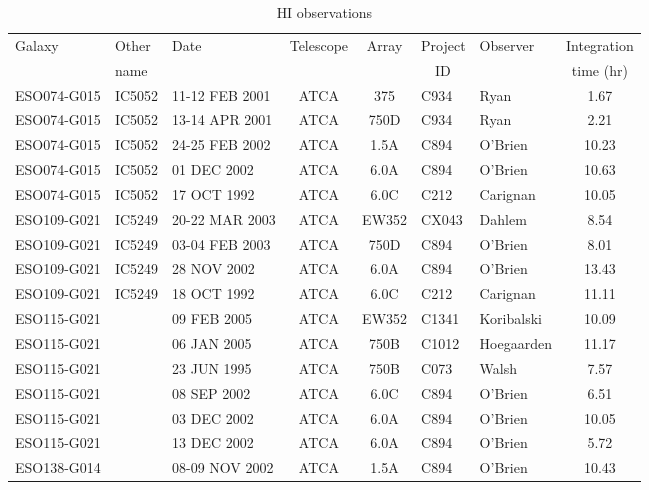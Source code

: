 \documentclass[traditabstract]{aa} %
\begin{document}
\begin{table}[t] %
\centering
\caption[HI observations]{HI observations}
\label{tab:obs-HI}
\begin{small}
\begin{tabular}{lllccllc}
\hline
Galaxy & Other & Date & Telescope & Array & Project & Observer
& Integration \\
& name &&&& \ \ ID && time (hr) \\
\hline\hline
ESO074-G015 & IC5052  & 11-12 FEB 2001 & ATCA & 375   & C934    & Ryan       &     1.67 \\
ESO074-G015 & IC5052  & 13-14 APR 2001 & ATCA & 750D  & C934    & Ryan       &     2.21  \\
ESO074-G015 & IC5052  & 24-25 FEB 2002 & ATCA & 1.5A  & C894    & O'Brien    &    10.23   \\
ESO074-G015 & IC5052  & 01 DEC 2002    & ATCA & 6.0A  & C894    & O'Brien    &    10.63   \\
ESO074-G015 & IC5052  & 17 OCT 1992    & ATCA & 6.0C  & C212    & Carignan   &    10.05   \\
\hline
ESO109-G021 & IC5249  & 20-22 MAR 2003 & ATCA & EW352 & CX043   & Dahlem     &     8.54   \\
ESO109-G021 & IC5249  & 03-04 FEB 2003 & ATCA & 750D  & C894    & O'Brien    &     8.01  \\
ESO109-G021 & IC5249  & 28 NOV 2002    & ATCA & 6.0A  & C894    & O'Brien    &    13.43   \\
ESO109-G021 & IC5249  & 18 OCT 1992    & ATCA & 6.0C  & C212    & Carignan   &    11.11  \\
\hline
ESO115-G021 &         & 09 FEB 2005    & ATCA & EW352 & C1341   & Koribalski &    10.09   \\
ESO115-G021 &         & 06 JAN 2005    & ATCA & 750B  & C1012   & Hoegaarden &    11.17   \\
ESO115-G021 &         & 23 JUN 1995    & ATCA & 750B  & C073    & Walsh      &     7.57   \\
ESO115-G021 &         & 08 SEP 2002    & ATCA & 6.0C  & C894    & O'Brien    &     6.51  \\
ESO115-G021 &         & 03 DEC 2002    & ATCA & 6.0A  & C894    & O'Brien    &    10.05   \\
ESO115-G021 &         & 13 DEC 2002    & ATCA & 6.0A  & C894    & O'Brien    &     5.72  \\
\hline
ESO138-G014 &         & 08-09 NOV 2002 & ATCA & 1.5A  & C894    & O'Brien    &    10.43   \\

\end{tabular}
\end{small}
\end{table}
\end{document}
